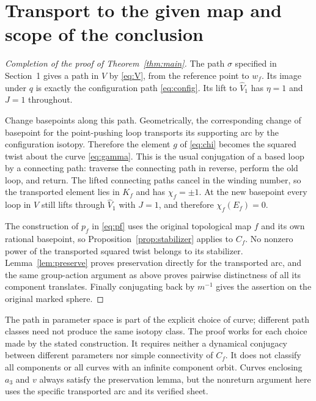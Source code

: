 \documentclass[11pt]{article}
\theoremstyle{remark}
\begin{document}
\section{Transport to the given map and scope of the conclusion}


\begin{proof}[Completion of the proof of Theorem~\ref{thm:main}]
The path $\sigma$ specified in Section~1 gives a path in $V$ by \eqref{eq:V}, from the reference point to $w_f$. Its image under $q$ is exactly the configuration path \eqref{eq:config}. Its lift to $\widehat V_1$ has $\eta=1$ and $J=1$ throughout.

Change basepoints along this path. Geometrically, the corresponding change of basepoint for the point-pushing loop transports its supporting arc by the configuration isotopy. Therefore the element $g$ of \eqref{eq:chi} becomes the squared twist about the curve \eqref{eq:gamma}. This is the usual conjugation of a based loop by a connecting path: traverse the connecting path in reverse, perform the old loop, and return. The lifted connecting paths cancel in the winding number, so the transported element lies in $K_f$ and has $\chi_f=\pm1$. At the new basepoint every loop in $V$ still lifts through $\widehat V_1$ with $J=1$, and therefore $\chi_f(E_f)=0$.

The construction of $p_f$ in \eqref{eq:pf} uses the original topological map $f$ and its own rational basepoint, so Proposition~\ref{prop:stabilizer} applies to $C_f$. No nonzero power of the transported squared twist belongs to its stabilizer. Lemma~\ref{lem:preserve} proves preservation directly for the transported arc, and the same group-action argument as above proves pairwise distinctness of all its component translates. Finally conjugating back by $m^{-1}$ gives the assertion on the original marked sphere.
\end{proof}

The path in parameter space is part of the explicit choice of curve; different path classes need not produce the same isotopy class. The proof works for each choice made by the stated construction. It requires neither a dynamical conjugacy between different parameters nor simple connectivity of $C_f$. It does not classify all components or all curves with an infinite component orbit. Curves enclosing $a_3$ and $v$ always satisfy the preservation lemma, but the nonreturn argument here uses the specific transported arc and its verified sheet.
\end{document}
